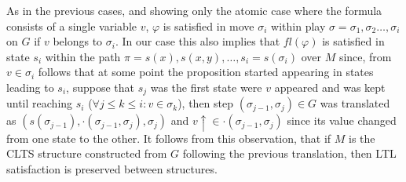 As in the previous cases, and showing only the atomic case where the formula consists of a single variable $v$, $\varphi$ is satisfied in move $\sigma_i$ within play $\sigma=\sigma_1,\sigma_2\ldots ,\sigma_i$ on $G$ if $v$ belongs to $\sigma_i$. In our case this also implies that $fl(\varphi)$ is satisfied in state $s_i$ within the path $\pi=s(x),s(x,y),\ldots,s_i=s(\sigma_i)$ over $M$ since, from $v \in \sigma_i$ follows that at some point the proposition started appearing in states leading to $s_i$, suppose that $s_j$ was the first state were $v$ appeared and was kept until reaching $s_i$ ($\forall j \leq k \leq i: v \in \sigma_k$), then step $(\sigma_{j-1},\sigma_j) \in G$ was translated as $(s(\sigma_{j-1}), \cdot(\sigma_{j-1},\sigma_j),\sigma_{j})$ and $v\uparrow \in \cdot(\sigma_{j-1},\sigma_j)$ since its value changed from one state to the other. It follows from this observation, that if $M$ is the CLTS structure constructed from $G$ following the previous translation, then LTL satisfaction is preserved between structures.
%
%
%
%


